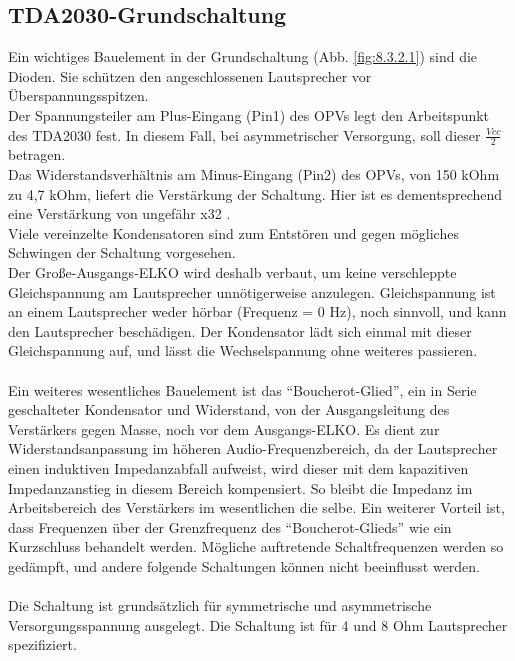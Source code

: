 \subsection{TDA2030-Grundschaltung}\label{subsec:8.3.2}
Ein wichtiges Bauelement in der Grundschaltung (Abb. \ref{fig:8.3.2.1}) sind die Dioden. Sie schützen den angeschlossenen Lautsprecher vor Überspannungsspitzen.\\
Der Spannungsteiler am Plus-Eingang (Pin1) des OPVs legt den Arbeitspunkt des TDA2030 fest.
In diesem Fall, bei asymmetrischer Versorgung, soll dieser $\frac{Vcc}{2}$ betragen.\\
Das Widerstandsverhältnis am Minus-Eingang (Pin2) des OPVs, von 150 kOhm zu 4,7 kOhm, liefert die Verstärkung der Schaltung.
Hier ist es dementsprechend eine Verstärkung von ungefähr x32 .\\
Viele vereinzelte Kondensatoren sind zum Entstören und gegen mögliches Schwingen der Schaltung vorgesehen.\\
Der Große-Ausgangs-ELKO wird deshalb verbaut, um keine verschleppte Gleichspannung am Lautsprecher unnötigerweise anzulegen.
Gleichspannung ist an einem Lautsprecher weder hörbar (Frequenz = 0 Hz), noch sinnvoll, und kann den Lautsprecher beschädigen.
Der Kondensator lädt sich einmal mit dieser Gleichspannung auf, und lässt die Wechselspannung ohne weiteres passieren.\\\\
Ein weiteres wesentliches Bauelement ist das \enquote{Boucherot-Glied}, ein in Serie geschalteter Kondensator und Widerstand, von der Ausgangsleitung des Verstärkers gegen Masse, noch vor dem Ausgangs-ELKO.
Es dient zur Widerstandsanpassung im höheren Audio-Frequenzbereich, da der Lautsprecher einen induktiven Impedanzabfall aufweist, wird dieser mit dem kapazitiven Impedanzanstieg in diesem Bereich kompensiert.
So bleibt die Impedanz im Arbeitsbereich des Verstärkers im wesentlichen die selbe.
Ein weiterer Vorteil ist, dass Frequenzen über der Grenzfrequenz des \enquote{Boucherot-Glieds} wie ein Kurzschluss behandelt werden. 
Mögliche auftretende Schaltfrequenzen werden so gedämpft, und andere folgende Schaltungen können nicht beeinflusst werden.
\\\\
Die Schaltung ist grundsätzlich für symmetrische und asymmetrische Versorgungsspannung ausgelegt. 
Die Schaltung ist für 4 und 8 Ohm Lautsprecher spezifiziert.
\newpage
